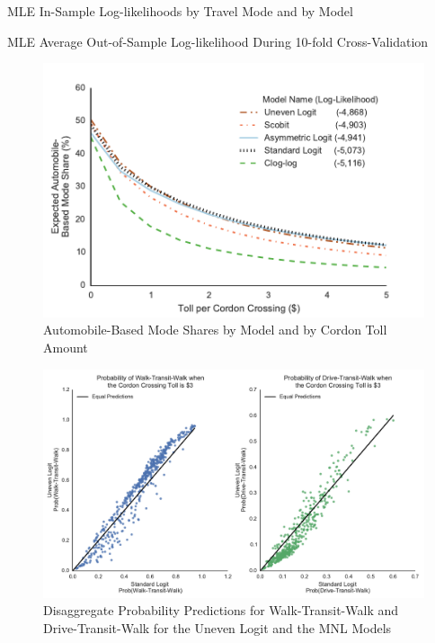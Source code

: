 \begin{table}
\centering

\caption{MLE In-Sample Log-likelihoods by Travel Mode and by Model}
\label{table:mle_log_likelihood_by_mode}



\end{table}

\begin{table}
\centering

\caption{MLE Average Out-of-Sample Log-likelihood During 10-fold Cross-Validation}
\label{table:mle_cross_validation}



\end{table}

\begin{figure}
\centering
\includegraphics[width=\textwidth]{chapter3/images/Fig4}
\caption{Automobile-Based Mode Shares by Model and by Cordon Toll Amount}
\label{fig:mode_shares_by_toll}
\end{figure}

\begin{figure}
\centering
\includegraphics[width=\textwidth]{chapter3/images/Fig5}
\caption{Disaggregate Probability Predictions for Walk-Transit-Walk and Drive-Transit-Walk for the Uneven Logit and the MNL Models}
\label{fig:disagg_toll_prob_predictions}
\end{figure}

